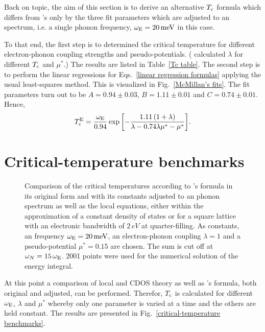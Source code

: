 Back on topic, the aim of this section is to derive an alternative $T \sb{\text{c}}$
formula which differs from 's only by the three fit parameters
which are adjusted to an  spectrum, i.e. a single phonon
frequency, $\omega \sb{\text{E}} = 20 \, \mathrm{meV}$ in this case.

To that end, the first step is to determined the critical temperature for
different electron-phonon coupling strengths and 
pseudo-potentials. ( calculated $\lambda$ for different $T \sb{\text{c}}$ and $\mu^*$.) The results are listed in Table~\ref{Tc table}. The second step
is to perform the linear regressions for Eqs.~\ref{linear regression formulas}
applying the usual least-squares method. This is visualized in
Fig.~\ref{McMillan's fits}. The fit parameters turn out to be $A = 0.94 \pm
0.03$, $B = 1.11 \pm 0.01$ and $C = 0.74 \pm 0.01$. Hence,
%
\begin{equation*}
    T \sb{\text{c}} \sp{\text{E}} = \frac{\omega \sb{\text{E}}}{0.94} \exp \bigg[ {-\frac
        {1.11 \, (1 + \lambda)}
        {\lambda - 0.74 \lambda \mu^* - \mu^*}}
    \bigg].
\end{equation*}

\section{Critical-temperature benchmarks}

\begin{figure}
    \small
    
    
    
    
    \caption[Critical-temperature benchmarks]{
        Comparison of the critical temperatures according to 's
        formula in its original form and with its constants adjusted to an
         phonon spectrum as well as the local 
        equations, either within the approximation of a constant density of
        states or for a square lattice with an electronic bandwidth of $2 \,
        \unit{eV}$ at quarter-filling. As constants, an 
        frequency $\omega \sb{\text{E}} = 20 \, \mathrm{meV}$, an electron-phonon
        coupling $\lambda = 1$ and a  pseudo-potential $\mu^* =
        0.15$ are chosen. The  sum is cut off at $\omega_N = 15
        \, \omega \sb{\text{E}}$. 2001 points were used for the numerical solution of
        the energy integral.}
    \label{critical-temperature benchmarks}
\end{figure}
%
At this point a comparison of local and CDOS  theory as well as
's formula, both original and adjusted, can be performed.
Therefor, $T \sb{\text{c}}$ is calculated for different $\omega \sb{\text{E}}$, $\lambda$ and
$\mu^*$ whereby only one parameter is varied at a time and the others are held
constant. The results are presented in Fig.~\ref{critical-temperature
benchmarks}.

